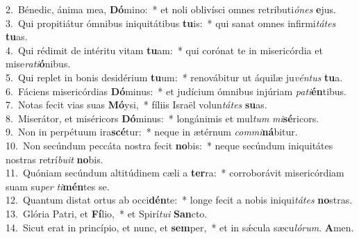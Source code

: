 {2.~}Bénedic, ánima mea, \textbf{Dó}mino:~* et noli oblivísci omnes retributi\textit{ó}\textit{nes} \textbf{e}jus.\\
{3.~}Qui propitiátur ómnibus iniquitátibus \textbf{tu}is:~* qui sanat omnes infirmi\textit{tá}\textit{tes} \textbf{tu}as.\\
{4.~}Qui rédimit de intéritu vitam \textbf{tu}am:~* qui corónat te in misericórdia et mise\textit{ra}\textit{ti}\textbf{ó}nibus.\\
{5.~}Qui replet in bonis desidérium \textbf{tu}um:~* renovábitur ut áquilæ ju\textit{vén}\textit{tus} \textbf{tu}a.\\
{6.~}Fáciens misericórdias \textbf{Dó}minus:~* et judícium ómnibus injúriam \textit{pa}\textit{ti}\textbf{én}tibus.\\
{7.~}Notas fecit vias suas \textbf{Mó}ysi,~* fíliis Israël volun\textit{tá}\textit{tes} \textbf{su}as.\\
{8.~}Miserátor, et miséricors \textbf{Dó}minus:~* longánimis et mul\textit{tum} \textit{mi}\textbf{sé}ricors.\\
{9.~}Non in perpétuum ira\textbf{scé}tur:~* neque in ætérnum \textit{com}\textit{mi}\textbf{ná}bitur.\\
{10.~}Non secúndum peccáta nostra fecit \textbf{no}bis:~* neque secúndum iniquitátes nostras retrí\textit{bu}\textit{it} \textbf{no}bis.\\
{11.~}Quóniam secúndum altitúdinem cæli a \textbf{ter}ra:~* corroborávit misericórdiam suam su\textit{per} \textit{ti}\textbf{mén}tes se.\\
{12.~}Quantum distat ortus ab occi\textbf{dén}te:~* longe fecit a nobis iniqui\textit{tá}\textit{tes} \textbf{no}stras.\\
{13.~}Glória Patri, et \textbf{Fí}lio,~* et Spirí\textit{tu}\textit{i} \textbf{San}cto.\\
{14.~}Sicut erat in princípio, et nunc, et \textbf{sem}per,~* et in sǽcula sæcu\textit{ló}\textit{rum}. \textbf{A}men.\\
